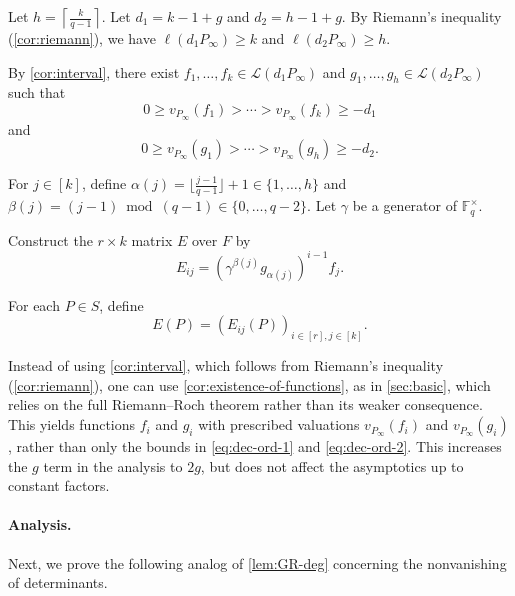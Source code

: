 \documentclass[11pt]{article}
\newcommand{\F}{\mathbb{F}}
\begin{document}
Let $h=\left\lceil\frac{k}{q-1}\right\rceil$.
Let $d_1=k-1+g$ and $d_2=h-1+g$. By Riemann's inequality (\cref{cor:riemann}), we have $\ell(d_1P_\infty)\geq k$ and $\ell(d_2P_\infty)\geq h$.

By \cref{cor:interval}, there exist $f_1,\dots,f_k\in \mathcal{L}(d_1P_\infty)$ and $g_1,\dots,g_h\in \mathcal{L}(d_2 P_\infty)$ such that
\begin{equation}\label{eq:dec-ord-1}
0\geq v_{P_\infty}(f_1) > \cdots > v_{P_\infty}(f_k) \geq -d_1
\end{equation}
and
\begin{equation}\label{eq:dec-ord-2}
0\geq v_{P_\infty}(g_1) > \cdots > v_{P_\infty}(g_h) \geq -d_2.
\end{equation}

For $j\in [k]$, define $\alpha(j)=\lfloor\frac{j-1}{q-1}\rfloor+1\in\{1,\dots,h\}$ and $\beta(j)=(j-1)\bmod (q-1)\in \{0,\dots,q-2\}$.
Let $\gamma$ be a generator of $\F_q^\times$.

Construct the $r\times k$ matrix $E$ over $F$ by
\[
E_{ij}=(\gamma^{\beta(j)} g_{\alpha(j)})^{i-1}  f_j.
\]

For each $P\in S$, define
\[
E(P)=(E_{ij}(P))_{i\in [r], j\in [k]}.
\]

\begin{remark}
Instead of using \cref{cor:interval}, which follows from Riemann's inequality (\cref{cor:riemann}), one can use \cref{cor:existence-of-functions}, as in \cref{sec:basic}, which relies on the full Riemann--Roch theorem rather than its weaker consequence. This yields functions $f_i$ and $g_i$ with prescribed valuations $v_{P_\infty}(f_i)$ and $v_{P_\infty}(g_i)$, rather than only the bounds in \eqref{eq:dec-ord-1} and \eqref{eq:dec-ord-2}. This increases the $g$ term in the analysis to $2g$, but does not affect the asymptotics up to constant factors.
\end{remark}

\paragraph{Analysis.}

Next, we prove the following analog of \cref{lem:GR-deg} concerning the nonvanishing of determinants.
\end{document}
